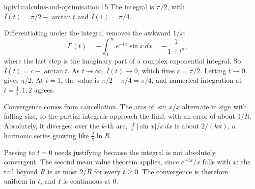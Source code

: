 \begin{solution}{iq:iv1:calculus-and-optimisation:15}
The integral is $\pi/2$, with $I(t) = \pi/2 - \arctan t$ and $I(1) = \pi/4$.

Differentiating under the integral removes the awkward $1/x$:
\[
I'(t) = -\int_0^\infty e^{-tx}\sin x\,dx = -\frac{1}{1 + t^2},
\]
where the last step is the imaginary part of a complex exponential integral. So $I(t) = c - \arctan t$. As $t \to \infty$, $I(t) \to 0$, which fixes $c = \pi/2$. Letting $t \to 0$ gives $\pi/2$. At $t = 1$, the value is $\pi/2 - \pi/4 = \pi/4$, and numerical integration at $t = \frac12, 1, 2$ agrees.

Convergence comes from cancellation. The arcs of $\sin x/x$ alternate in sign with falling size, so the partial integrals approach the limit with an error of about $1/R$. Absolutely, it diverges: over the $k$-th arc, $\int|\sin x|/x\,dx$ is about $2/(k\pi)$, a harmonic series growing like $\frac{2}{\pi}\ln R$.

Passing to $t = 0$ needs justifying because the integral is not absolutely convergent. The second mean value theorem applies, since $e^{-tx}/x$ falls with $x$: the tail beyond $R$ is at most $2/R$ for every $t \ge 0$. The convergence is therefore uniform in $t$, and $I$ is continuous at 0.



\end{solution}

